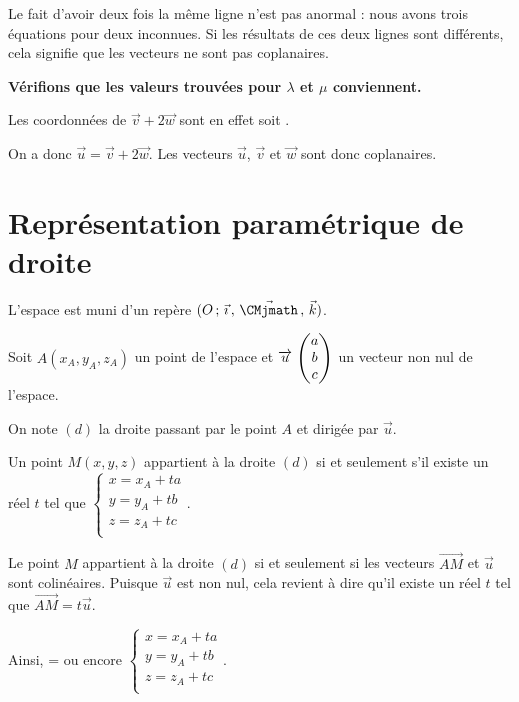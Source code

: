 \documentclass[11pt,fleqn, openany]{book} %
\begin{document}
\begin{example}
Le fait d'avoir deux fois la même ligne n'est pas anormal : nous avons trois équations pour deux inconnues. Si les résultats de ces deux lignes sont différents, cela signifie que les vecteurs ne sont pas coplanaires.

\textbf{Vérifions que les valeurs trouvées pour $\lambda$ et $\mu$ conviennent.}

Les coordonnées de $\vec v + 2 \vec w$ sont en effet \renewcommand{\arraystretch}{1} soit \renewcommand{\arraystretch}{1}. 

On a donc $\vec u = \vec{v} + 2 \vec w$. Les vecteurs $\vec u$, $\vec v$ et $\vec w$ sont donc coplanaires.

\end{example}


\section{Représentation paramétrique de droite}

\begin{proposition}L'espace est muni d'un repère $\Oijk$.

Soit $A (x_A,y_A,z_A)$ un point de l'espace et $\renewcommand{\arraystretch}{1}\coorde{u}{a}{b}{c}$ un vecteur non nul de l'espace.

On note $(d)$ la droite passant par le point $A$ et dirigée par $\vec u$.

Un point $M(x,y,z)$ appartient à la droite $(d)$ si et seulement s'il existe un réel $t$ tel que $\renewcommand{\arraystretch}{1}\left\{ \begin{array}{l}x=x_A+ta \\ y=y_A+tb \\ z = z_A + tc \\

\end{array}\right.$.
\end{proposition}

\begin{demonstration} Le point $M$ appartient à la droite $(d)$ si et seulement si les vecteurs $\overrightarrow{AM}$ et $\vec u$ sont colinéaires. Puisque $\vec u$ est non nul, cela revient à dire qu'il existe un réel $t$ tel que $\overrightarrow{AM}=t \vec u$.


Ainsi, \renewcommand{\arraystretch}{1} = \renewcommand{\arraystretch}{1} ou encore $\left\{ \begin{array}{l}x=x_A+ta \\ y=y_A+tb \\ z = z_A + tc \\

\end{array}\right.$.\end{demonstration}
\end{document}
